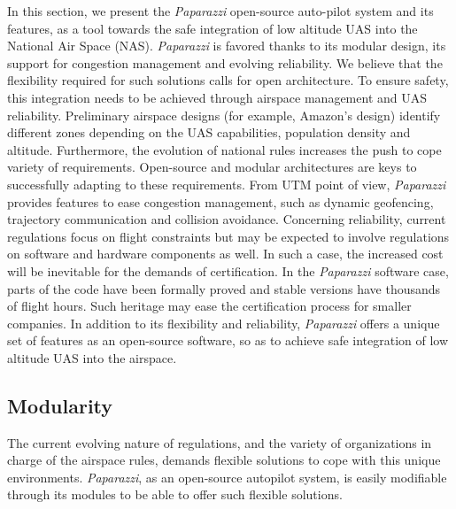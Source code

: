 In this section, we present the \emph{Paparazzi} open-source auto-pilot system and its features, as a tool towards the safe integration of low altitude UAS into the National Air Space (NAS). 
\emph{Paparazzi} is favored thanks to its modular design, its support for congestion management and evolving reliability.
We believe that the flexibility required for such solutions calls for open architecture. To ensure safety, this integration needs to be achieved through airspace management and UAS reliability.
Preliminary airspace designs (for example, Amazon's design) identify different zones depending on the UAS capabilities, population density and altitude. 
Furthermore, the evolution of national rules increases the push to cope variety of requirements. Open-source and modular architectures are keys to successfully adapting to these requirements. 
From UTM point of view, \emph{Paparazzi} provides features to ease congestion management, such as dynamic geofencing, trajectory communication and collision avoidance. 
Concerning reliability, current regulations focus on flight constraints but may be expected to involve regulations on software and hardware components as well. 
In such a case, the increased cost will be inevitable for the demands of certification. 
In the \emph{Paparazzi} software case, parts of the code have been formally proved and stable versions have thousands of flight hours. Such heritage may ease the certification process for smaller companies.
In addition to its flexibility and reliability, \emph{Paparazzi} offers a unique set of features as an open-source software, so as to achieve safe integration of low altitude UAS into the airspace.


\subsection{Modularity}
The current evolving nature of regulations, and the variety of organizations in charge of the airspace rules, demands flexible solutions to cope with this unique environments. \emph{Paparazzi}, as an open-source autopilot system, is easily modifiable through its modules to be able to offer such flexible solutions.  

